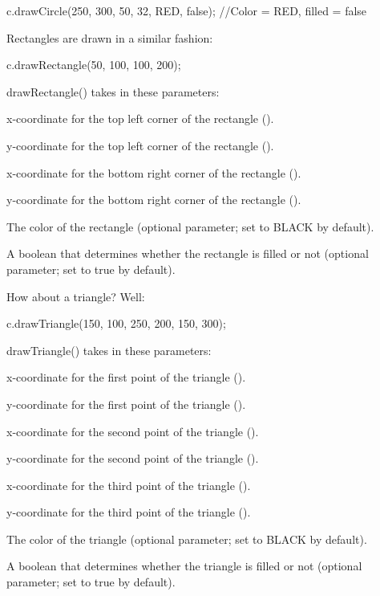 \begin{DoxyCode}
c.drawCircle(250, 300, 50, 32, RED, \textcolor{keyword}{false});  \textcolor{comment}{//Color = RED, filled = false}
\end{DoxyCode}


Rectangles are drawn in a similar fashion\+:


\begin{DoxyCode}
c.drawRectangle(50, 100, 100, 200);
\end{DoxyCode}


draw\+Rectangle() takes in these parameters\+:


\begin{DoxyItemize}
\item x-\/coordinate for the top left corner of the rectangle ({}).
\item y-\/coordinate for the top left corner of the rectangle ({}).
\item x-\/coordinate for the bottom right corner of the rectangle ({}).
\item y-\/coordinate for the bottom right corner of the rectangle ({}).
\item The color of the rectangle (optional parameter; set to {\ttfamily B\+L\+A\+C\+K} by default).
\item A boolean that determines whether the rectangle is filled or not (optional parameter; set to {\ttfamily true} by default).
\end{DoxyItemize}

How about a triangle? Well\+:


\begin{DoxyCode}
c.drawTriangle(150, 100, 250, 200, 150, 300);
\end{DoxyCode}


draw\+Triangle() takes in these parameters\+:


\begin{DoxyItemize}
\item x-\/coordinate for the first point of the triangle ({}).
\item y-\/coordinate for the first point of the triangle ({}).
\item x-\/coordinate for the second point of the triangle ({}).
\item y-\/coordinate for the second point of the triangle ({}).
\item x-\/coordinate for the third point of the triangle ({}).
\item y-\/coordinate for the third point of the triangle ({}).
\item The color of the triangle (optional parameter; set to {\ttfamily B\+L\+A\+C\+K} by default).
\item A boolean that determines whether the triangle is filled or not (optional parameter; set to {\ttfamily true} by default).
\end{DoxyItemize}

